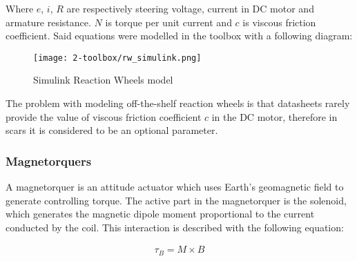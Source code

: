         Where $e$, $i$, $R$ are respectively steering voltage, current in DC motor and armature resistance. $N$ is torque per unit current and $c$ is viscous friction coefficient. Said equations were modelled in the toolbox with a following diagram: 
        
        \begin{figure}[H]
            \centering
            \texttt{[image: 2-toolbox/rw\_simulink.png]}
            \caption{Simulink Reaction Wheels model}
            \label{fig:rw_simulink}
        \end{figure}

        The problem with modeling off-the-shelf reaction wheels is that datasheets rarely provide the value of viscous friction coefficient $c$ in the DC motor, therefore in \ac{scars} it is considered to be an optional parameter. 
        
        
        



    \subsubsection{Magnetorquers}
        A magnetorquer is an attitude actuator which uses Earth's geomagnetic field to generate controlling torque. The active part in the magnetorquer is the solenoid, which generates the magnetic dipole moment proportional to the current conducted by the coil. This interaction is described with the following equation:

        \begin{align}
            \tau_B = M \times B
        \end{align}

